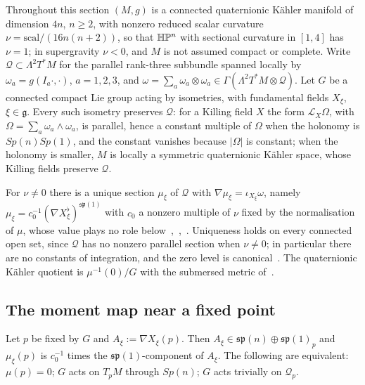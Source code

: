 Throughout this section $(M,g)$ is a connected quaternionic K\"ahler manifold of dimension $4n$,
$n\geq2$, with nonzero reduced scalar curvature $\nu=\mathrm{scal}/(16n(n+2))$, so that
$\mathbb H\mathbb P^n$ with sectional curvature in $[1,4]$ has $\nu=1$; in supergravity $\nu<0$, and $M$ is not
assumed compact or complete. Write $\mathcal Q\subset\Lambda^2T^*M$ for the parallel rank-three
subbundle spanned locally by $\omega_a=g(I_a\cdot,\cdot)$, $a=1,2,3$, and
$\omega=\sum_a\omega_a\otimes\omega_a\in\Gamma(\Lambda^2T^*M\otimes\mathcal Q)$. Let $G$ be a
connected compact Lie group acting by isometries, with fundamental fields $X_\xi$,
$\xi\in\mathfrak g$. Every such isometry preserves $\mathcal Q$: for a Killing field $X$ the form
$\mathcal L_X\Omega$, with $\Omega=\sum_a\omega_a\wedge\omega_a$, is parallel, hence a constant
multiple of $\Omega$ when the holonomy is $Sp(n)Sp(1)$, and the constant vanishes because
$|\Omega|$ is constant; when the holonomy is smaller, $M$ is locally a symmetric quaternionic
K\"ahler space, whose Killing fields preserve $\mathcal Q$.

For $\nu\neq0$ there is a unique section $\mu_\xi$ of $\mathcal Q$ with
$\nabla\mu_\xi=\iota_{X_\xi}\omega$, namely
$\mu_\xi=c_0^{-1}(\nabla X_\xi^\flat)^{\mathfrak{sp}(1)}$ with $c_0$ a nonzero
multiple of $\nu$ fixed by the normalisation of $\mu$, whose value plays no role
below~\cite{Galicki:1987},~\cite[Thm.~2.4]{Galicki:1988},~\cite[p.~434]{Swann:1991}.
Uniqueness holds on every connected open set, since $\mathcal Q$ has no nonzero parallel section
when $\nu\neq0$; in particular there are no constants of integration, and the zero level is
canonical~\cite[pp.~7--8]{Galicki:1988}. The quaternionic K\"ahler quotient is
$\mu^{-1}(0)/G$ with the submersed metric of~\cite[Thm.~3.1]{Galicki:1988}.

\subsection{The moment map near a fixed point}
\label{subsec:qk-fixed}

\begin{lemma}\label{lem:isotropy}
Let $p$ be fixed by $G$ and $A_\xi:=\nabla X_\xi(p)$. Then
$A_\xi\in\mathfrak{sp}(n)\oplus\mathfrak{sp}(1)_p$ and $\mu_\xi(p)$ is $c_0^{-1}$ times the
$\mathfrak{sp}(1)$-component of $A_\xi$. The following are equivalent: $\mu(p)=0$; $G$ acts on
$T_pM$ through $Sp(n)$; $G$ acts trivially on $\mathcal Q_p$.
\end{lemma}

